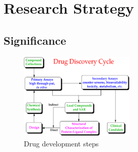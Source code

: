 \section{Research Strategy}

\subsection{Significance}



\begin{figure}%
\includegraphics[width=0.49\textwidth]{../figures/wiki_drug.png}
\caption{Drug development steps\cite{wiki_drug}}
\label{fig:wiki_drug}
\end{figure}

